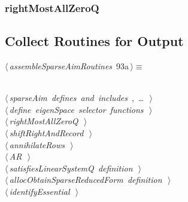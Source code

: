 \documentclass{article}
\begin{document}
\subsubsection{rightMostAllZeroQ}


\subsection{Collect  Routines for Output}
\label{sec:collect}



\begin{flushleft} \small
\begin{minipage}{\linewidth}\label{scrap173}\raggedright\small
{} $\langle\,${\itshape assembleSparseAimRoutines}\nobreak\ {\footnotesize {93a}}$\,\rangle\equiv$
\vspace{-1ex}
\begin{list}{}{} \item
\mbox{}\verb@@\\
\mbox{}\verb@@\hbox{$\langle\,${\itshape sparseAim defines and includes}\nobreak\ {\footnotesize {}, \ldots\ }$\,\rangle$}\verb@@\\
\mbox{}\verb@@\hbox{$\langle\,${\itshape define eigenSpace selector functions}\nobreak\ {\footnotesize {}}$\,\rangle$}\verb@@\\
\mbox{}\verb@@\hbox{$\langle\,${\itshape rightMostAllZeroQ}\nobreak\ {\footnotesize {}}$\,\rangle$}\verb@@\\
\mbox{}\verb@@\hbox{$\langle\,${\itshape shiftRightAndRecord}\nobreak\ {\footnotesize {}}$\,\rangle$}\verb@@\\
\mbox{}\verb@@\hbox{$\langle\,${\itshape annihilateRows}\nobreak\ {\footnotesize {}}$\,\rangle$}\verb@@\\
\mbox{}\verb@@\hbox{$\langle\,${\itshape AR}\nobreak\ {\footnotesize {}}$\,\rangle$}\verb@@\\
\mbox{}\verb@@\hbox{$\langle\,${\itshape satisfiesLinearSystemQ definition}\nobreak\ {\footnotesize {}}$\,\rangle$}\verb@@\\
\mbox{}\verb@@\hbox{$\langle\,${\itshape allocObtainSparseReducedForm definition}\nobreak\ {\footnotesize {}}$\,\rangle$}\verb@@\\
\mbox{}\verb@@\hbox{$\langle\,${\itshape identifyEssential}\nobreak\ {\footnotesize {}}$\,\rangle$}\verb@@\\

\end{list}
\end{minipage}
\end{flushleft}
\end{document}
